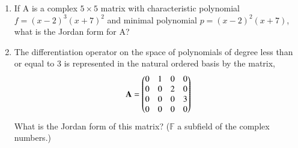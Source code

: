 \renewcommand{\theequation}{\theenumi}
\renewcommand{\thefigure}{\theenumi}
\begin{enumerate}[label=\thesubsection.\arabic*.,ref=\thesubsection.\theenumi]

\item If A is a complex $5 \times 5$ matrix with characteristic polynomial $f = (x-2)^3 (x+7)^2$ and minimal polynomial $p = (x-2)^2 (x+7)$, what is the Jordan form for A? 
%
\\
\solution


\item The differentiation operator on the space of polynomials of degree less than or equal to 3 is represented in the natural ordered basis by the matrix,
\begin{align}
\mathbf{A} = \begin{pmatrix}0&1&0&0\\0&0&2&0\\0&0&0&3\\0&0&0&0\end{pmatrix}
\end{align}
What is the Jordan form of this matrix? ($\mathbb{F}$ a subfield of the complex numbers.) 
%
%
\\
\solution

\end{enumerate}
